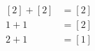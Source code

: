 \documentclass[preview]{standalone}
\begin{document}
\begin{align*}
\begin{aligned}[2] + [2] &= [2] \\1 + 1 &= [2] \\2 + 1 &= [1]\end{aligned}
\end{align*}
\end{document}

